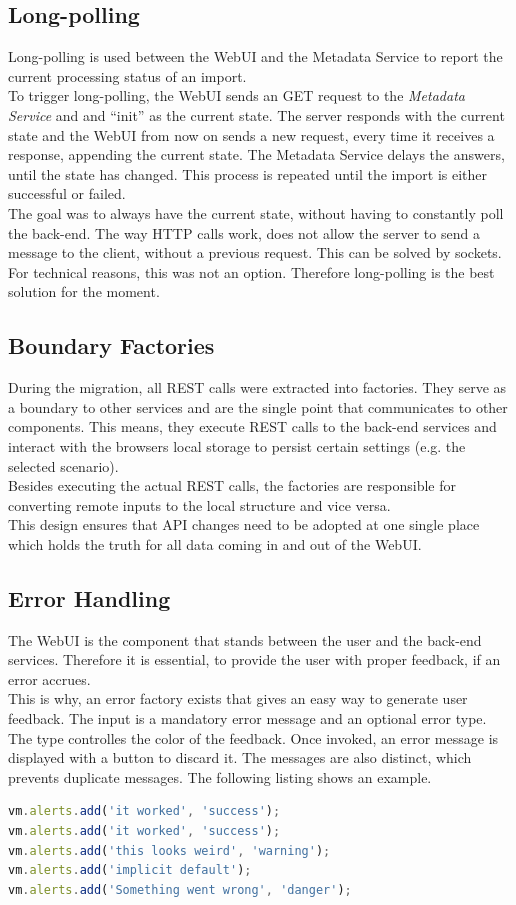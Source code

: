 \subsection{Long-polling}
\label{sec:long-polling}
Long-polling is used between the WebUI and the Metadata Service to report the current processing status of an import.\\
To trigger long-polling, the WebUI sends an GET request to the \textit{Metadata Service} and and \enquote{init} as the current state. The server responds with the current state and the WebUI from now on sends a new request, every time it receives a response, appending the current state. The Metadata Service delays the answers, until the state has changed. This process is repeated until the import is either successful or failed.\\
The goal was to always have the current state, without having to constantly poll the back-end. The way HTTP calls work, does not allow the server to send a message to the client, without a previous request. This can be solved by sockets. For technical reasons, this was not an option. Therefore long-polling is the best solution for the moment.

\subsection{Boundary Factories}
During the migration, all REST calls were extracted into factories. They serve as a boundary to other services and are the single point that communicates to other components. This means, they execute REST calls to the back-end services and interact with the browsers local storage to persist certain settings (e.g. the selected scenario).\\
Besides executing the actual REST calls, the factories are responsible for converting remote inputs to the local structure and vice versa.\\
This design ensures that API changes need to be adopted at one single place which holds the truth for all data coming in and out of the WebUI.


\subsection{Error Handling}
The WebUI is the component that stands between the user and the back-end services. Therefore it is essential, to provide the user with proper feedback, if an error accrues.\\
This is why, an error factory exists that gives an easy way to generate user feedback. The input is a mandatory error message and an optional error type. The type controlles the color of the feedback. Once invoked, an error message is displayed with a button to discard it. The messages are also distinct, which prevents duplicate messages. The following listing shows an example. 
\begin{lstlisting}[language=javascript, caption=error handling]
vm.alerts.add('it worked', 'success');
vm.alerts.add('it worked', 'success');
vm.alerts.add('this looks weird', 'warning');
vm.alerts.add('implicit default');
vm.alerts.add('Something went wrong', 'danger');
\end{lstlisting}

